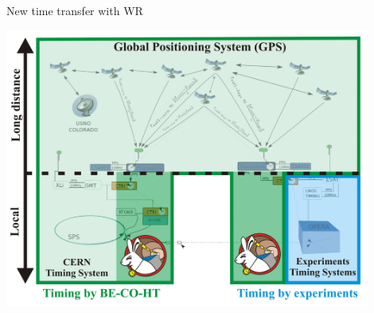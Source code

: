 \documentclass[compress,red]{beamer}
\begin{document}
\begin{frame}{New time transfer with WR}

      \begin{center}
      \includegraphics[width=0.9\textwidth]{applications/cngs-timing-3.pdf}
      \end{center}

\end{frame}
\end{document}
